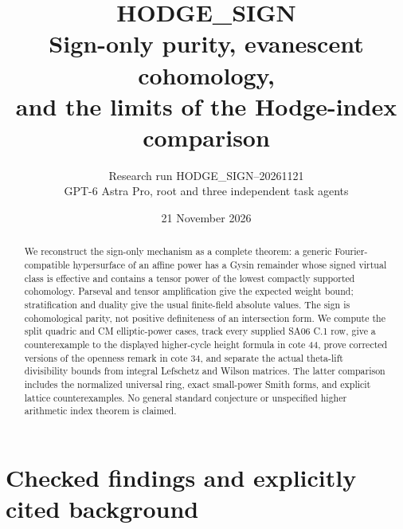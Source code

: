 \documentclass[11pt,a4paper]{article}
\title{\textbf{HODGE\_SIGN}\\[5pt]
\large Sign-only purity, evanescent cohomology,\\
and the limits of the Hodge-index comparison}
\author{Research run HODGE\_SIGN--20261121\\
\small GPT-6 Astra Pro, root and three independent task agents}
\date{21 November 2026}
\theoremstyle{remark}
\begin{document}
\maketitle
\begin{abstract}
We reconstruct the sign-only mechanism as a complete theorem: a generic
Fourier-compatible hypersurface of an affine power has a Gysin remainder
whose signed virtual class is effective and contains a tensor power of the
lowest compactly supported cohomology.  Parseval and tensor amplification
give the expected weight bound; stratification and duality give the usual
finite-field absolute values.  The sign is cohomological parity, not
positive definiteness of an intersection form.  We compute the split
quadric and CM elliptic-power cases, track every supplied SA06 C.1 row,
give a counterexample to the displayed higher-cycle height formula in
cote 44, prove corrected versions of the openness remark in cote 34, and
separate the actual theta-lift divisibility bounds from integral Lefschetz
and Wilson matrices.  The latter comparison includes the normalized
universal ring, exact small-power Smith forms, and explicit lattice
counterexamples.  No general standard conjecture or unspecified higher
arithmetic index theorem is claimed.
\end{abstract}
\tableofcontents
\newpage
\part{Checked findings and explicitly cited background}
\end{document}
